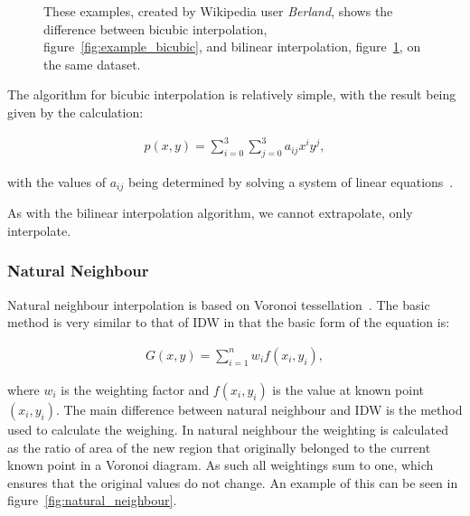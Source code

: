 \begin{figure}[H]
\begin{subfigure}{.5\textwidth}
                    \caption{}
                    \label{fig:example_bilinear}
                \end{subfigure}
                \caption{These examples, created by Wikipedia user \emph{Berland}, shows the difference between bicubic interpolation, figure~\ref{fig:example_bicubic}, and bilinear interpolation, figure~\ref{fig:example_bilinear}, on the same dataset.}
                \label{fig:bicubic_vs_bilinear}
            \end{figure}

            The algorithm for bicubic interpolation is relatively simple, with the result being given by the calculation:

            \begin{align*}
                p(x,y) = \sum_{i=0}^{3}{\sum_{j=0}^{3}{a_{ij}x^{i}y^{j}}},
            \end{align*}

            with the values of $a_{ij}$ being determined by solving a system of linear equations~\cite{bicubicorigins}.

            As with the bilinear interpolation algorithm, we cannot extrapolate, only interpolate. 

        \subsubsection{Natural Neighbour}\label{background_interpolation_methods_natural_neighbour}

            Natural neighbour interpolation is based on Voronoi tessellation~\cite{multivariatedata}. The basic method is very similar to that of IDW in that the basic form of the equation is:

            \begin{align*}
                G(x,y) = \sum_{i=1}^{n}{w_{i}f(x_{i},y_{i})}, 
            \end{align*}

            where $w_{i}$ is the weighting factor and $f(x_{i},y_{i})$ is the value at known point $(x_{i},y_{i})$. The main difference between natural neighbour and IDW is the method used to calculate the weighing. In natural neighbour the weighting is calculated as the ratio of area of the new region that originally belonged to the current known point in a Voronoi diagram. As such all weightings sum to one, which ensures that the original values do not change. An example of this can be seen in figure~\ref{fig:natural_neighbour}.

